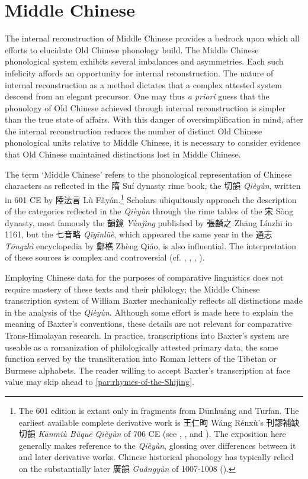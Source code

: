 \chapter{Middle Chinese}\label{chapter-3.-Middle-chinese}

The internal reconstruction of Middle Chinese provides a bedrock upon
which all efforts to elucidate Old Chinese phonology build. The Middle
Chinese phonological system exhibits several imbalances and asymmetries.
Each such infelicity affords an opportunity for internal
reconstruction. The nature of internal reconstruction as a method
dictates that a complex attested system descend from an elegant
precursor. One may thus \emph{a priori} guess that the phonology of Old
Chinese achieved through internal reconstruction is simpler than the
true state of affairs. With this danger of oversimplification in mind,
after the internal reconstruction reduces the number of distinct Old
Chinese phonological units relative to Middle Chinese, it is necessary
to consider evidence that Old Chinese maintained distinctions lost in
Middle Chinese.

The term `Middle Chinese' refers to the phonological representation of
Chinese characters as reflected in the 隋 Suí dynasty rime book, the
切韻  \emph{Qièyùn}, written in 601 CE by 陸法言 Lù Fǎyán.\footnote{The
  601 edition is extant only in fragments from Dūnhuáng and Turfan. The
  earliest available complete derivative work is 王仁昫 Wáng Rénxù's
  刊謬補缺切韻  \emph{Kānmiù Bǔquē Qièyùn} of 706 CE (see 
  \cite[62]{Chang1974}, \cite{Takata2004}, and 
  \cite{Bottero2013}). The exposition here generally makes
  reference to the  \emph{Qièyùn}, glossing over differences between it
  and later derivative works. Chinese historical phonology has typically
  relied on the substantially later 廣韻  \emph{Guǎngyùn} of 1007-1008
  (\cite[16-20]{Baxter2014OldChinese}).} Scholars ubiquitously approach the
description of the categories reflected in the  \emph{Qièyùn} through the
rime tables of the 宋 Sòng dynasty, most famously the 韻鏡
 \emph{Yùnjìng} published by 張麟之 Zhāng Línzhī in 1161, but the 七音略
 \emph{Qīyīnlüè}, which appeared the same year in the 通志 \emph{Tōngzhì}
encyclopedia by 鄭樵 Zhèng Qiáo, is also influential. The
in­ter­pre­ta­tion of these sources is complex and con­tro­versial (cf. \cite{Branner2000c},
\cite[8-20]{Baxter2014OldChinese},
\cite{Handel2014},
\cite{jacques17traditional}).

Employing Chinese data for the purposes of comparative linguistics does
not require mastery of these texts and their philology; the Middle
Chinese transcription system of William Baxter 
\citeyearpar[27-86]{Baxter1992}
mechanically reflects all distinctions made in the analysis of the
 \emph{Qièyùn}. Although some effort is made here to explain the meaning
of Baxter's conventions, these details are not relevant for comparative
Trans-Himalayan research. In practice, transcriptions into Baxter's
system are useable as a romanization of philologically attested primary
data, the same function served by the translit­er­a­tion into Roman
letters of the Tibetan or Burmese alphabets. The reader willing to
accept Baxter's transcription at face value may skip ahead to 
\ref{par:rhymes-of-the-Shijing}.

